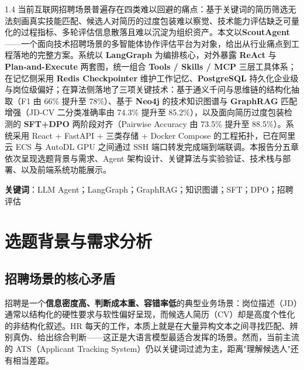 \documentclass[12pt,a4paper]{ctexart}
\begin{document}
\begin{spacing}{1.4}
\noindent
当前互联网招聘场景普遍存在四类难以回避的痛点：基于关键词的简历筛选无法刻画真实技能匹配、候选人对简历的过度包装难以察觉、技术能力评估缺乏可量化的过程指标、多轮评估信息散落且难以沉淀为组织资产。本文以\textbf{ScoutAgent}——一个面向技术招聘场景的多智能体协作评估平台为对象，给出从行业痛点到工程落地的完整方案。系统以 \textbf{LangGraph} 为编排核心，对外暴露 \textbf{ReAct} 与 \textbf{Plan-and-Execute} 两套图，统一组合 \textbf{Tools / Skills / MCP} 三层工具体系；在记忆侧采用 \textbf{Redis Checkpointer} 维护工作记忆、\textbf{PostgreSQL} 持久化企业级与岗位级偏好；在算法侧落地了三项关键技术：基于通义千问与思维链的结构化抽取（F1 由 66\% 提升至 78\%）、基于 \textbf{Neo4j} 的技术知识图谱与 \textbf{GraphRAG} 匹配增强（JD-CV 二分类准确率由 74.3\% 提升至 85.2\%），以及面向简历过度包装检测的 \textbf{SFT+DPO} 两阶段对齐（Pairwise Accuracy 由 73.5\% 提升至 88.5\%）。系统采用 React + FastAPI + 三类存储 + Docker Compose 的工程拓扑，已在阿里云 ECS 与 AutoDL GPU 之间通过 SSH 端口转发完成端到端联调。本报告分五章依次呈现选题背景与需求、Agent 架构设计、关键算法与实验验证、技术栈与部署、以及前端系统功能展示。

\vspace{0.8cm}

\noindent\textbf{关键词}：LLM Agent；LangGraph；GraphRAG；知识图谱；SFT；DPO；招聘评估
\end{spacing}

\newpage

\setcounter{tocdepth}{2}
\tableofcontents
\newpage

\section{选题背景与需求分析}\label{sec:bg}

\subsection{招聘场景的核心矛盾}

招聘是一个\textbf{信息密度高、判断成本重、容错率低}的典型业务场景：岗位描述（JD）通常以结构化的硬性要求与软性偏好呈现，而候选人简历（CV）却是高度个性化的非结构化叙述。HR 每天的工作，本质上就是在大量异构文本之间寻找匹配、辨别真伪、给出综合判断——这正是大语言模型最适合发挥的场景。然而，当前主流的 ATS（Applicant Tracking System）仍以关键词过滤为主，距离"理解候选人"还有相当差距。
\end{document}
